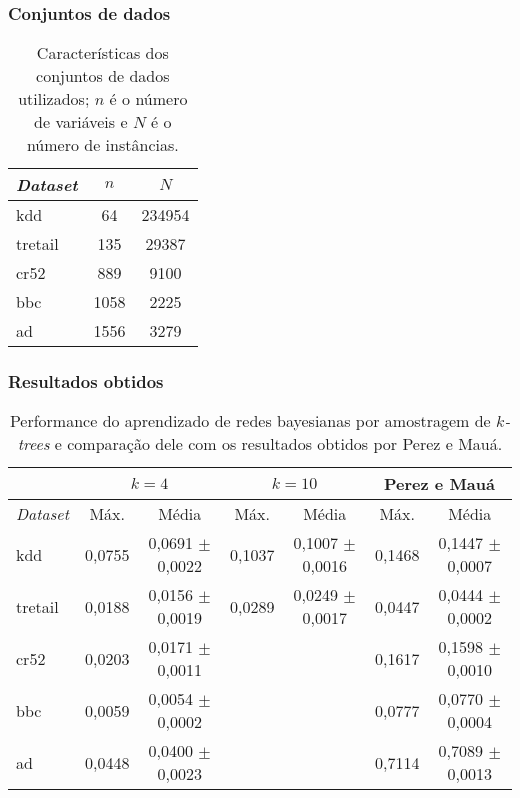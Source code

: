 \documentclass{beamer}
\begin{document}
  \begin{frame}
    \frametitle{Conjuntos de dados}

    \begin{table}
      \centering
      \begin{tabular}{l c c} \hline
        \emph{Dataset} & $n$ & $N$ \\ \hline
        kdd & 64 & 234954 \\
        tretail & 135 & 29387 \\
        cr52 & 889 & 9100 \\
        bbc & 1058 & 2225 \\
        ad & 1556 & 3279 \\ \hline
      \end{tabular}

      \caption{Características dos conjuntos de dados utilizados; $n$ é o número de variáveis e $N$ é o número de instâncias.}
      \label{tab:conjuntos}
    \end{table}
  \end{frame}

  \begin{frame}
    \frametitle{Resultados obtidos}

    \begin{table}
      \centering

      {\tiny
        \begin{tabular}{l c c c c c c} \hline
          & \multicolumn{2}{c}{$k = 4$} & \multicolumn{2}{c}{$k = 10$} & \multicolumn{2}{c}{Perez e Mauá} \\ \hline
          \emph{Dataset} & Máx. & Média & Máx. & Média & Máx. & Média \\ \hline
          kdd & 0,0755 & 0,0691 $\pm$ 0,0022 & 0,1037 & 0,1007 $\pm$ 0,0016 & 0,1468 & 0,1447 $\pm$ 0,0007 \\
          tretail & 0,0188 & 0,0156 $\pm$ 0,0019 & 0,0289 & 0,0249 $\pm$ 0,0017 & 0,0447 & 0,0444 $\pm$ 0,0002 \\
          cr52 & 0,0203 & 0,0171 $\pm$ 0,0011 & & & 0,1617 & 0,1598 $\pm$ 0,0010 \\
          bbc & 0,0059 & 0,0054 $\pm$ 0,0002 & & & 0,0777 & 0,0770 $\pm$ 0,0004 \\
          ad & 0,0448 & 0,0400 $\pm$ 0,0023 & & & 0,7114 & 0,7089 $\pm$ 0,0013 \\ \hline
        \end{tabular}
      }

      \caption{Performance do aprendizado de redes bayesianas por amostragem de \emph{$k$-trees} e comparação dele com os resultados obtidos por Perez e Mauá.}
      \label{tab:comparacao}
    \end{table}
  \end{frame}
\end{document}
